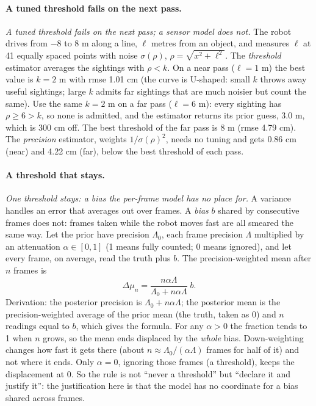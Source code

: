 \documentclass[11pt]{article}
\newcommand{\slt}[1]{\emph{#1}}   %
\begin{document}
\paragraph{A tuned threshold fails on the next pass.} \slt{A tuned threshold fails on the next pass; a sensor model does not.} The robot drives from $-8$ to $8$ m along a line, $\ell$ metres from an object, and measures $\ell$ at 41 equally spaced points with noise $\sigma(\rho)$, $\rho=\sqrt{x^2+\ell^2}$. The \emph{threshold} estimator averages the sightings with $\rho<k$. On a near pass ($\ell=1$ m) the best value is $k=2$ m with rmse 1.01 cm (the curve is U-shaped: small $k$ throws away useful sightings; large $k$ admits far sightings that are much noisier but count the same). Use the same $k=2$ m on a far pass ($\ell=6$ m): every sighting has $\rho\ge6>k$, so none is admitted, and the estimator returns its prior guess, 3.0 m, which is 300 cm off. The best threshold of the far pass is 8 m (rmse 4.79 cm). The \emph{precision} estimator, weights $1/\sigma(\rho)^2$, needs no tuning and gets 0.86 cm (near) and 4.22 cm (far), below the best threshold of each pass.

\paragraph{A threshold that stays.} \slt{One threshold stays: a bias the per-frame model has no place for.} A variance handles an error that averages out over frames. A \emph{bias} $b$ shared by consecutive frames does not: frames taken while the robot moves fast are all smeared the same way. Let the prior have precision $\Lambda_0$, each frame precision $\Lambda$ multiplied by an attenuation $\alpha\in[0,1]$ (1 means fully counted; 0 means ignored), and let every frame, on average, read the truth plus $b$. The precision-weighted mean after $n$ frames is
\[
\Delta\mu_n=\frac{n\alpha\Lambda}{\Lambda_0+n\alpha\Lambda}\;b .
\]
Derivation: the posterior precision is $\Lambda_0+n\alpha\Lambda$; the posterior mean is the precision-weighted average of the prior mean (the truth, taken as 0) and $n$ readings equal to $b$, which gives the formula. For any $\alpha>0$ the fraction tends to 1 when $n$ grows, so the mean ends displaced by the \emph{whole} bias. Down-weighting changes how fast it gets there (about $n\approx\Lambda_0/(\alpha\Lambda)$ frames for half of it) and not where it ends. Only $\alpha=0$, ignoring those frames (a threshold), keeps the displacement at 0. So the rule is not ``never a threshold'' but ``declare it and justify it'': the justification here is that the model has no coordinate for a bias shared across frames.
\end{document}
